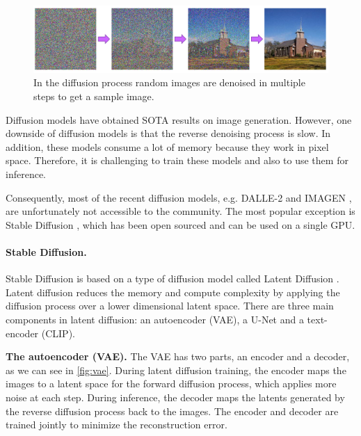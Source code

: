 \begin{figure}[ht]
    \centering
    \includegraphics[width=\linewidth]{images/diffusion/diffusion-process.png}
    \caption{In the diffusion process random images are denoised in multiple steps to get a sample image.}
    \label{fig:diffusion_process}
\end{figure}

Diffusion models have obtained SOTA results on image generation. However, one downside of diffusion models is that the reverse denoising process is slow. In addition, these models consume a lot of memory because they work in pixel space. Therefore, it is challenging to train these models and also to use them for inference.

Consequently, most of the recent diffusion models, e.g. DALLE-2 \cite{ramesh2022hierarchical} and IMAGEN \cite{saharia2022photorealistic}, are unfortunately not accessible to the community. The most popular exception is Stable Diffusion \cite{rombach2021highresolution}, which has been open sourced and can be used on a single GPU.

\paragraph{Stable Diffusion.}

Stable Diffusion is based on a type of diffusion model called Latent Diffusion \cite{rombach2021highresolution}. Latent diffusion reduces the memory and compute complexity by applying the diffusion process over a lower dimensional latent space. There are three main components in latent diffusion: an autoencoder (VAE), a U-Net and a text-encoder (CLIP).

\textbf{The autoencoder (VAE).} The VAE \cite{kingma2013auto} has two parts, an encoder and a decoder, as we can see in \cref{fig:vae}. During latent diffusion training, the encoder maps the images to a latent space for the forward diffusion process, which applies more noise at each step. During inference, the decoder maps the latents generated by the reverse diffusion process back to the images. The encoder and decoder are trained jointly to minimize the reconstruction error.

